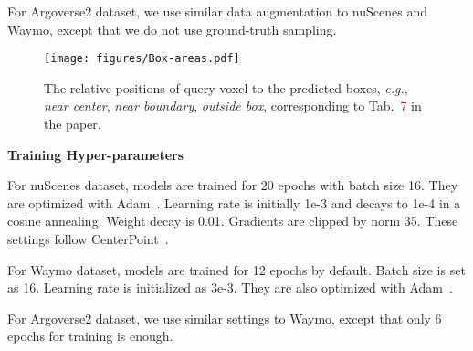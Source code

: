 \documentclass[10pt,twocolumn,letterpaper]{article}
\begin{document}
For Argoverse2 dataset, we use similar data augmentation to nuScenes and Waymo, except that we do not use ground-truth sampling.

\begin{figure}[t]
\begin{center}
   \texttt{[image: figures/Box-areas.pdf]}
   \caption{The relative positions of query voxel to the predicted boxes, {\em e.g.}, {\em near center}, {\em near boundary}, {\em outside box}, corresponding to Tab.~\textcolor{red}{7} in the paper.}
   \label{fig:boxe-areas}
\end{center}
\end{figure}
\vspace{0.5em}
\noindent
\textbf{Training Hyper-parameters}

For nuScenes dataset, models are trained for 20 epochs with batch size 16. They are optimized with Adam~\cite{adam}. Learning rate is initially 1e-3 and decays to 1e-4 in a cosine annealing. Weight decay is 0.01. Gradients are clipped by norm 35. These settings follow CenterPoint~\cite{centerpoint}. 

For Waymo dataset, models are trained for 12 epochs by default. Batch size is set as 16. Learning rate is initialized as 3e-3. They are also optimized with Adam~\cite{adam}. 

For Argoverse2 dataset, we use similar settings to Waymo, except that only 6 epochs for training is enough.
\end{document}
